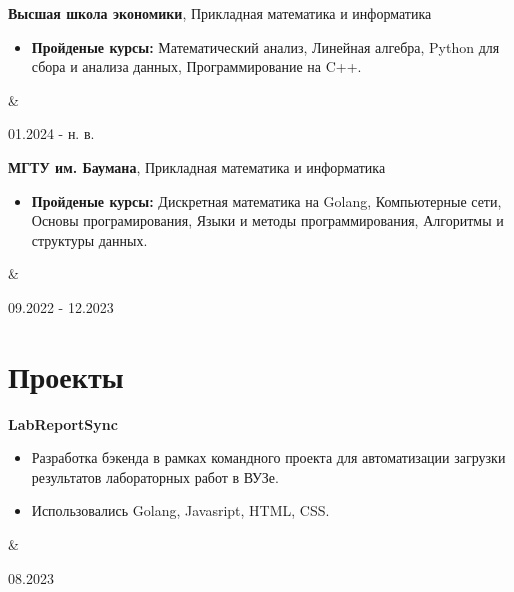 \documentclass[12pt, letterpaper]{article}
\newenvironment{highlights}{
        \begin{itemize}[
                topsep=0pt,
                parsep=0.10 cm,
                partopsep=0pt,
                itemsep=0pt,
                after=\vspace{-1\baselineskip},
                leftmargin=0.4 cm + 3pt
            ]
    }{
        \end{itemize}
    } %
\let\originalTabularx\tabularx
\let\originalEndTabularx\endtabularx
\renewenvironment{tabularx}{\bgroup\centering\originalTabularx}{\originalEndTabularx\par\egroup}
\begin{document}
        \begin{tabularx}{
            \textwidth-0.4 cm-0.13cm
        }{
            K{0.2 cm}
            R{4.1 cm}
        }
            \textbf{Высшая школа экономики}, Прикладная математика и информатика

            \vspace{0.10 cm}

            \begin{highlights}
                \item \textbf{Пройденые курсы:} Математический анализ, Линейная алгебра, Python для сбора и анализа данных, Программирование на C++.
            \end{highlights}
            &
            

            01.2024 - н. в.
        \end{tabularx}
        \vspace{0.2 cm}
        \begin{tabularx}{
            \textwidth-0.4 cm-0.13cm
        }{
            K{0.2 cm}
            R{4.1 cm}
        }
            \textbf{МГТУ им. Баумана}, Прикладная математика и информатика

            \vspace{0.10 cm}

            \begin{highlights}
                \item \textbf{Пройденые курсы:} Дискретная математика на Golang, Компьютерные сети, Основы програмирования, Языки и методы программирования, Алгоритмы и структуры данных.
            \end{highlights}
            &
            

            09.2022 - 12.2023
        \end{tabularx}


    
    \section{Проекты}

        \begin{tabularx}{
            \textwidth-0.4 cm-0.13cm
        }{
            K{0.2 cm}
            R{4.1 cm}
        }
            \textbf{LabReportSync}

            \vspace{0.10 cm}

            \begin{highlights}
                \item Разработка бэкенда в рамках командного проекта для автоматизации загрузки результатов лабораторных работ в ВУЗе.
                \item Использовались Golang, Javasript, HTML, CSS.
            \end{highlights}
            &
            

            08.2023
        \end{tabularx}
\end{document}
